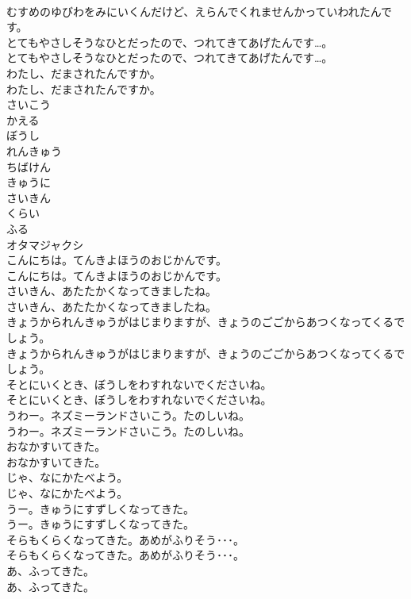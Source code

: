 \documentclass[8pt]{extreport}
\begin{document}
\begin{CJK}{UTF8}{min}
\\	むすめのゆびわをみにいくんだけど、えらんでくれませんかっていわれたんです。 
\\	とてもやさしそうなひとだったので、つれてきてあげたんです…。	
\\	とてもやさしそうなひとだったので、つれてきてあげたんです…。 
\\	わたし、だまされたんですか。	
\\	わたし、だまされたんですか。 
\\	さいこう
\\	かえる
\\	ぼうし
\\	れんきゅう
\\	ちばけん
\\	きゅうに
\\	さいきん
\\	くらい
\\	ふる
\\	オタマジャクシ
\\	こんにちは。てんきよほうのおじかんです。	
\\	こんにちは。てんきよほうのおじかんです。 
\\	さいきん、あたたかくなってきましたね。	
\\	さいきん、あたたかくなってきましたね。 
\\	きょうかられんきゅうがはじまりますが、きょうのごごからあつくなってくるでしょう。	
\\	きょうかられんきゅうがはじまりますが、きょうのごごからあつくなってくるでしょう。 
\\	そとにいくとき、ぼうしをわすれないでくださいね。	
\\	そとにいくとき、ぼうしをわすれないでくださいね。 
\\	うわー。ネズミーランドさいこう。たのしいね。	
\\	うわー。ネズミーランドさいこう。たのしいね。 
\\	おなかすいてきた。	
\\	おなかすいてきた。 
\\	じゃ、なにかたべよう。	
\\	じゃ、なにかたべよう。 
\\	うー。きゅうにすずしくなってきた。	
\\	うー。きゅうにすずしくなってきた。 
\\	そらもくらくなってきた。あめがふりそう･･･。	
\\	そらもくらくなってきた。あめがふりそう･･･。 
\\	あ、ふってきた。	
\\	あ、ふってきた。 

\end{CJK}
\end{document}
